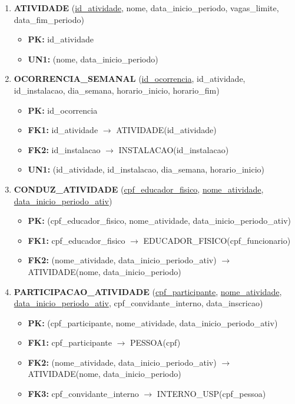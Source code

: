 \documentclass{article}
\begin{document}
\begin{enumerate}
    \item \textbf{ATIVIDADE} (\underline{id\_atividade}, nome, data\_inicio\_periodo, vagas\_limite, data\_fim\_periodo)
    \begin{itemize}
        \item \textbf{PK:} id\_atividade 
        \item \textbf{UN1:} (nome, data\_inicio\_periodo)
    \end{itemize}

    \item \textbf{OCORRENCIA\_SEMANAL} (\underline{id\_ocorrencia}, id\_atividade, id\_instalacao, dia\_semana, horario\_inicio, horario\_fim)
    \begin{itemize}
        \item \textbf{PK:} id\_ocorrencia
        \item \textbf{FK1:} id\_atividade $\rightarrow$ ATIVIDADE(id\_atividade)
        \item \textbf{FK2:} id\_instalacao $\rightarrow$ INSTALACAO(id\_instalacao)
        \item \textbf{UN1:} (id\_atividade, id\_instalacao, dia\_semana, horario\_inicio)
    \end{itemize}
        
    \item \textbf{CONDUZ\_ATIVIDADE} (\underline{cpf\_educador\_fisico}, \underline{nome\_atividade}, \underline{data\_inicio\_periodo\_ativ})
        \begin{itemize}
            \item \textbf{PK:} (cpf\_educador\_fisico, nome\_atividade, data\_inicio\_periodo\_ativ)
            \item \textbf{FK1:} cpf\_educador\_fisico $\rightarrow$ EDUCADOR\_FISICO(cpf\_funcionario)
            \item \textbf{FK2:} (nome\_atividade, data\_inicio\_periodo\_ativ) $\rightarrow$ ATIVIDADE(nome, data\_inicio\_periodo)
        \end{itemize}

    \item \textbf{PARTICIPACAO\_ATIVIDADE} (\underline{cpf\_participante}, \underline{nome\_atividade}, \underline{data\_inicio\_periodo\_ativ}, cpf\_convidante\_interno, data\_inscricao)
        \begin{itemize}
            \item \textbf{PK:} (cpf\_participante, nome\_atividade, data\_inicio\_periodo\_ativ)
            \item \textbf{FK1:} cpf\_participante $\rightarrow$ PESSOA(cpf)
            \item \textbf{FK2:} (nome\_atividade, data\_inicio\_periodo\_ativ) $\rightarrow$ ATIVIDADE(nome, data\_inicio\_periodo)
            \item \textbf{FK3:} cpf\_convidante\_interno $\rightarrow$ INTERNO\_USP(cpf\_pessoa)
        \end{itemize}
        

\end{enumerate}
\end{document}
